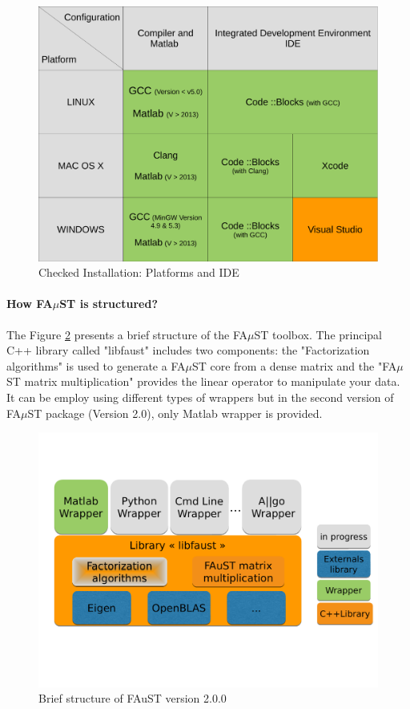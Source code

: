 \begin{figure}[H] %
\centering
\includegraphics[scale=0.4]{images/recapInstall.pdf}
\caption{Checked Installation: Platforms and IDE}
\label{fig:recapInstall}
\end{figure}

\paragraph{How FA$\mu$ST is structured?}
The Figure \ref{fig:faustStructure} presents a brief structure of the FA$\mu$ST toolbox. The principal C++ library called "libfaust" includes two components: the "Factorization algorithms" is used to generate a FA$\mu$ST core from a dense matrix and the "FA$\mu$ST matrix multiplication" provides the linear operator to manipulate your data. It can be employ using different types of wrappers but in the second version of FA$\mu$ST package (Version 2.0), only Matlab wrapper is provided. 


\begin{figure}[H] %
\centering
\includegraphics[scale=0.45,trim = 0cm 5cm 0cm 4cm, clip]{images/FaustStructure.pdf}
\caption{Brief structure of FAuST version 2.0.0}
\label{fig:faustStructure}
\end{figure}

